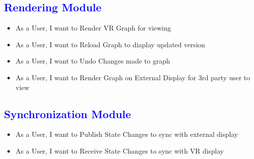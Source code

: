 \documentclass[12pt]{article}
\begin{document}
\begin{flushleft}
	\textcolor{blue}{\subsection{Rendering Module}}	
	\begin{flushleft}
	\begin{itemize}
	\item As a User, I want to Render VR Graph for viewing
	\item As a User, I want to Reload Graph to diaplay updated version
	\item As a User, I want to Undo Changes made to graph
	\item As a User, I want to Render Graph on External Display for 3rd party user to view
	\end{itemize}	
	\end{flushleft}
	
	\textcolor{blue}{\subsection{Synchronization Module}}	
	\begin{flushleft}
	\begin{itemize}
	\item As a User, I want to Publish State Changes to sync with external display
	\item As a User, I want to Receive State Changes to sync with VR display
	\end{itemize}	
	\end{flushleft}
	
	
\end{flushleft}
\end{document}
